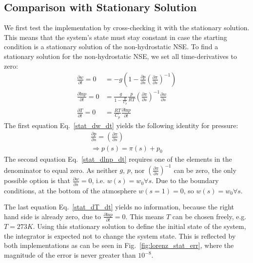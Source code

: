 \subsection{Comparison with Stationary Solution}
We first test the implementation by cross-checking it with the stationary solution.
This means that the system's state must stay constant in case the starting condition is a stationary solution of the non-hydrostatic NSE.
To find a stationary solution for the non-hydrostatic NSE, we set all time-derivatives to zero:
\begin{align}
\frac{\partial w}{\partial t} =0&= -g\left(1 - \frac{\partial p}{\partial s}\left(\frac{\partial \pi}{\partial s}\right)^{-1}\right)\label{stat_dw_dt} \\
\frac{\partial \text{ln}p}{\partial t}=0 &= \frac{g}{1- \frac{R}{C_p}} \frac{p}{RT}\left(\frac{\partial \pi}{\partial s}\right)^{-1} \frac{\partial w}{\partial s}\label{stat_dlnp_dt}\\
\frac{\partial T}{\partial t} =0&= \frac{RT}{C_p}\frac{\partial \text{ln}p}{\partial t}\label{stat_dT_dt}
\end{align}
The first equation Eq.~\ref{stat_dw_dt} yields the following identity for pressure:
\begin{align*}
\frac{\partial p}{\partial s}=\left(\frac{\partial \pi}{\partial s}\right)\\
\Rightarrow p(s)=\pi (s) + p_0
\end{align*}
The second equation Eq.~\ref{stat_dlnp_dt} requires one of the elements in the denominator to equal zero.
As neither $g$, $p$, nor $\left(\frac{\partial \pi}{\partial s}\right)^{-1}$ can be zero, the only possible option is that $\frac{\partial w}{\partial s}=0$, i.e. $w(s)=w_0 \forall s$.
Due to the boundary conditions, at the bottom of the atmosphere $w(s=1)=0$, so $w(s)=w_0 \forall s$.

The last equation Eq.~\ref{stat_dT_dt} yields no information, because the right hand side is already zero, due to $\frac{\partial \text{ln}p}{\partial t}=0$.
This means $T$ can be chosen freely, e.g. $T=273K$.
Using this stationary solution to define the initial state of the system, the integrator is expected not to change the system state.
This is reflected by both implementations as can be seen in Fig.~\ref{fig:lorenz_stat_err}, where the magnitude of the error is never greater than $10^{-8}$.

